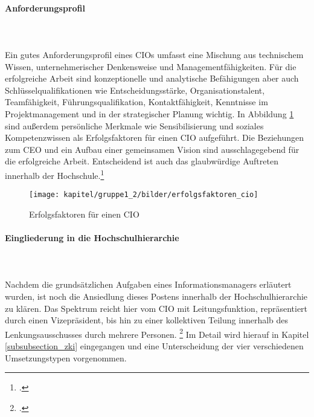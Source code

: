 \paragraph{Anforderungsprofil}\mbox{}\\\\
\label{anforderungsprofil_informationsmanager}
Ein gutes Anforderungsprofil eines CIOs umfasst eine Mischung aus technischem Wissen, unternehmerischer Denkensweise und Managementfähigkeiten. Für die erfolgreiche Arbeit sind konzeptionelle und analytische Befähigungen aber auch Schlüsselqualifikationen wie Entscheidungsstärke, Organisationstalent, Teamfähigkeit, Führungsqualifikation, Kontaktfähigkeit, Kenntnisse im Projektmanagement und  in der strategischer Planung wichtig. In Abbildung \ref{efec} sind außerdem persönliche Merkmale wie Sensibilisierung und soziales Kompetenzwissen als Erfolgsfaktoren für einen CIO aufgeführt. Die Beziehungen zum CEO und ein Aufbau einer gemeinsamen Vision sind ausschlagegebend für die erfolgreiche Arbeit. Entscheidend ist auch das glaubwürdige Auftreten innerhalb der Hochschule.\footcite[Vgl.][150]{krcmar_einfuhrung_2015}

\begin{figure}[h!]
	\centering
	\texttt{[image: kapitel/gruppe1\_2/bilder/erfolgsfaktoren\_cio]} 
	\caption{Erfolgsfaktoren für einen CIO\protect\footnotemark}
	\label{efec}
\end{figure}

\paragraph{Eingliederung in die Hochschulhierarchie}\mbox{}\\\\
Nachdem die grundsätzlichen Aufgaben eines Informationsmanagers erläutert wurden, ist noch die Ansiedlung dieses Postens innerhalb der Hochschulhierarchie zu klären. Das Spektrum reicht hier vom CIO mit Leitungsfunktion, repräsentiert durch einen Vizepräsident, bis hin zu einer kollektiven Teilung innerhalb des Lenkungsausschusses durch mehrere Personen. \footcite[Vgl.][10]{leitner_itil_2008} Im Detail wird hierauf in Kapitel \ref{subsubsection_zki} eingegangen und eine Unterscheidung der vier verschiedenen Umsetzungstypen vorgenommen. 

